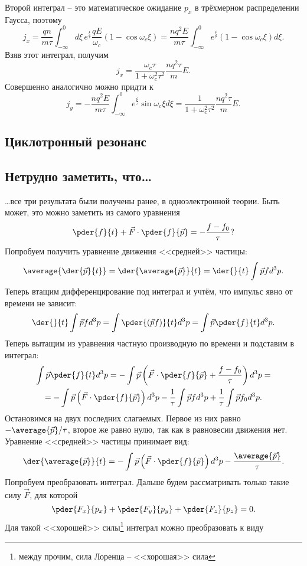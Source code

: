 Второй интеграл -- это математическое ожидание \( p_x \) в трёхмерном
распределении Гаусса, поэтому
\[
    j_x = \frac{qn}{m\tau} \int_{-\infty}^0 d\xi\, e^\frac{\xi}{\tau}
    \frac{qE}{\omega_c}(1-\cos\omega_c\xi) =
    \frac{nq^2E}{m\tau}
    \int_{-\infty}^0e^\frac{\xi}{\tau}(1-\cos\omega_c\xi)d\xi.
\]
Взяв этот интеграл, получим
\[
    j_x = \frac{\omega_c\tau}{1+\omega_c^2\tau^2}\frac{nq^2\tau}{m}E.
\]
Совершенно аналогично можно придти к
\[
    j_y = -\frac{nq^2E}{m\tau}
    \int_{-\infty}^0e^\frac{\xi}{\tau}\sin\omega_c\xi d\xi =
    \frac{1}{1+\omega_c^2\tau^2}\frac{nq^2\tau}{m}E.
\]

\subsection{Циклотронный резонанс}
\subsection{Нетрудно заметить, что\ldots}
\ldots все три результата были получены ранее, в одноэлектронной теории. Быть
может, это можно заметить из самого уравнения
\[
    \pder{f}{t} + \vec{F}\cdot\pder{f}{\vec{p}} = -\frac{f-f_0}{\tau}?
\]
Попробуем получить уравнение движения <<средней>> частицы:
\[
    \average{\der{\vec{p}}{t}} = \der{\average{\vec{p}}}{t} =
    \der{}{t}\int\vec{p} f d^3p.
\]
Теперь втащим дифференцирование под интеграл и учтём, что импульс явно от
времени не зависит:
\[
    \der{}{t}\int\vec{p} f d^3p = \int\pder{(\vec{p} f)}{t} d^3p =
    \int\vec{p}\pder{f}{t} d^3p.
\]
Теперь вытащим из уравнения частную производную по времени и подставим в
интеграл:
\begin{gather*}
    \int\vec{p}\pder{f}{t} d^3p = -\int\vec{p}
    \left(\vec{F}\cdot\pder{f}{\vec{p}} + \frac{f-f_0}{\tau}\right)d^3p = \\ =
    -\int\vec{p}\left(\vec{F}\cdot\pder{f}{\vec{p}}\right)d^3p
    -\frac{1}{\tau}\int\vec{p}fd^3p + \frac{1}{\tau}\int\vec{p}f_0d^3p.
\end{gather*}
Остановимся на двух последних слагаемых. Первое из них равно
\( -\average{\vec{p}}/\tau \), второе же равно нулю, так как в равновесии
движения нет. Уравнение <<средней>> частицы принимает вид:
\[
    \der{\average{\vec{p}}}{t} =
    -\int\vec{p}\left(\vec{F}\cdot\pder{f}{\vec{p}}\right)d^3p
    -\frac{\average{\vec{p}}}{\tau}.
\]
Попробуем преобразовать интеграл. Дальше будем рассматривать только такие силу
\( \vec{F} \), для которой
\[
    \pder{F_x}{p_x} + \pder{F_y}{p_y} + \pder{F_z}{p_z} = 0.
\]
Для такой <<хорошей>> силы\footnote{между прочим, сила Лоренца -- <<хорошая>>
сила} интеграл можно преобразовать к виду
